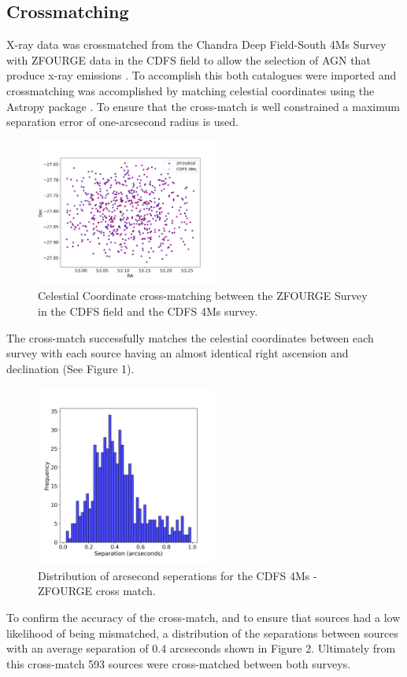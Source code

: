 \documentclass[12pt]{iopart}
\begin{document}
\subsection{Crossmatching}
X-ray data was crossmatched from the Chandra Deep Field-South 4Ms Survey \cite{xue_chandra_2011} with ZFOURGE data in the CDFS field to allow the selection of AGN that produce x-ray emissions \cite{szokoly_chandra_2004}. To accomplish this both catalogues were imported and crossmatching was accomplished by matching celestial coordinates using the Astropy package \cite{the_astropy_collaboration_astropy_2013}. To ensure that the cross-match is well constrained a maximum separation error of one-arcsecond radius is used. 
\newpage 
\begin{figure}[h]
  \centering
  \includegraphics[width=0.54\textwidth]{plots/CDFS_4Ms_Xray_ZFOURGE_XMatch.png}
  \caption{Celestial Coordinate cross-matching between the ZFOURGE Survey in the CDFS field and the CDFS 4Ms survey.}
  \label{fig:your_label}
\end{figure}
The cross-match successfully matches the celestial coordinates between each survey with each source having an almost identical right ascension and declination (See Figure 1).
\begin{figure}[h]
  \centering
  \includegraphics[width=0.53\textwidth]{plots/CDFS_4Ms_Xray_Sep.png}
  \caption{Distribution of arcsecond seperations for the CDFS 4Ms - ZFOURGE cross match.}
  \label{fig:your_label}
\end{figure}
\newpage
To confirm the accuracy of the cross-match, and to ensure that sources had a low likelihood of being mismatched, a distribution of the separations between sources with an average separation of 0.4 arcseconds shown in Figure 2. Ultimately from this cross-match 593 sources were cross-matched between both surveys. 
\end{document}

